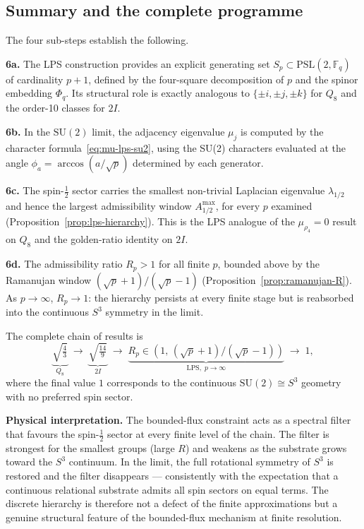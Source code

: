 \subsection{Summary and the complete programme}
\label{sec:step6-summary}

The four sub-steps establish the following.

\medskip
\noindent\textbf{6a.} The LPS construction provides an explicit generating
set $S_p \subset \mathrm{PSL}(2,\mathbb{F}_q)$ of cardinality $p+1$,
defined by the four-square decomposition of $p$ and the spinor embedding
$\Phi_q$.
Its structural role is exactly analogous to $\{\pm i,\pm j,\pm k\}$ for
$Q_8$ and the order-10 classes for $2I$.

\medskip
\noindent\textbf{6b.}
In the $\mathrm{SU}(2)$ limit, the adjacency eigenvalue
$\mu_j$ is computed by the character formula~\eqref{eq:mu-lps-su2},
using the SU(2) characters evaluated at the angle $\phi_a =
\arccos(a/\sqrt{p})$ determined by each generator.

\medskip
\noindent\textbf{6c.}
The spin-$\tfrac{1}{2}$ sector carries the smallest non-trivial
Laplacian eigenvalue $\lambda_{1/2}$ and hence the largest admissibility
window $A^{\max}_{1/2}$, for every $p$ examined
(Proposition~\ref{prop:lps-hierarchy}).
This is the LPS analogue of the $\mu_{\rho_4} = 0$ result on $Q_8$ and the
golden-ratio identity on $2I$.

\medskip
\noindent\textbf{6d.}
The admissibility ratio $R_p > 1$ for all finite $p$, bounded above by the
Ramanujan window $({\sqrt{p}+1})/({\sqrt{p}-1})$
(Proposition~\ref{prop:ramanujan-R}).
As $p \to \infty$, $R_p \to 1$: the hierarchy persists at every finite
stage but is reabsorbed into the continuous $S^3$ symmetry in the limit.

\medskip
The complete chain of results is
\begin{equation}
  \underbrace{\sqrt{\tfrac{4}{3}}}_{\displaystyle Q_8}
  \;\longrightarrow\;
  \underbrace{\sqrt{\tfrac{14}{9}}}_{\displaystyle 2I}
  \;\longrightarrow\;
  \underbrace{R_p \in (1,\,(\sqrt{p}+1)/(\sqrt{p}-1))}_{\displaystyle
  \mathrm{LPS},\; p \to \infty}
  \;\longrightarrow\;
  1,
  \label{eq:ratio-sequence}
\end{equation}
where the final value $1$ corresponds to the continuous $\mathrm{SU}(2)
\cong S^3$ geometry with no preferred spin sector.

\medskip
\noindent\textbf{Physical interpretation.}
The bounded-flux constraint acts as a spectral filter that favours the
spin-$\tfrac{1}{2}$ sector at every finite level of the chain.
The filter is strongest for the smallest groups (large $R$) and weakens
as the substrate grows toward the $S^3$ continuum.
In the limit, the full rotational symmetry of $S^3$ is restored and the
filter disappears — consistently with the expectation that a continuous
relational substrate admits all spin sectors on equal terms.
The discrete hierarchy is therefore not a defect of the finite
approximations but a genuine structural feature of the bounded-flux
mechanism at finite resolution.
